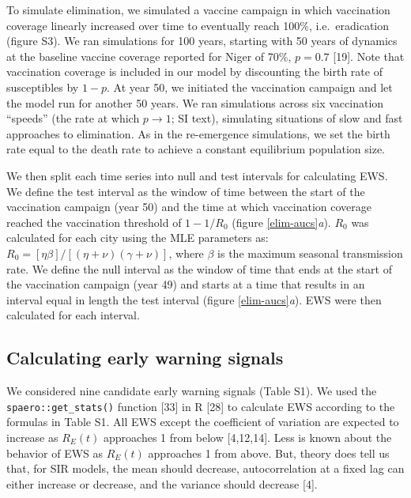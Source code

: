 \documentclass[3p]{elsarticle} %
\begin{document}
To simulate elimination, we simulated a vaccine campaign in which
vaccination coverage linearly increased over time to eventually reach
100\%, i.e.~eradication (figure S3). We ran simulations for 100 years,
starting with 50 years of dynamics at the baseline vaccine coverage
reported for Niger of 70\%, \(p = 0.7\) {[}19{]}. Note that vaccination
coverage is included in our model by discounting the birth rate of
susceptibles by \(1-p\). At year 50, we initiated the vaccination
campaign and let the model run for another 50 years. We ran simulations
across six vaccination ``speeds'' (the rate at which
\(p \rightarrow 1\); SI text), simulating situations of slow and fast
approaches to elimination. As in the re-emergence simulations, we set
the birth rate equal to the death rate to achieve a constant equilibrium
population size.

We then split each time series into null and test intervals for
calculating EWS. We define the test interval as the window of time
between the start of the vaccination campaign (year 50) and the time at
which vaccination coverage reached the vaccination threshold of
\(1 - 1/R_0\) (figure \ref{elim-aucs}\emph{a}). \(R_0\) was calculated
for each city using the MLE parameters as:
\(R_0 = \left[\eta \beta \right]/ \left[\left(\eta+\nu\right)\left(\gamma+\nu\right)\right]\),
where \(\beta\) is the maximum seasonal transmission rate. We define the
null interval as the window of time that ends at the start of the
vaccination campaign (year 49) and starts at a time that results in an
interval equal in length the test interval (figure
\ref{elim-aucs}\emph{a}). EWS were then calculated for each interval.

\hypertarget{calculating-early-warning-signals}{%
\subsection{Calculating early warning
signals}\label{calculating-early-warning-signals}}

We considered nine candidate early warning signals (Table S1). We used
the \texttt{spaero::get\_stats()} function {[}33{]} in R {[}28{]} to
calculate EWS according to the formulas in Table S1. All EWS except the
coefficient of variation are expected to increase as \(R_E(t)\)
approaches 1 from below {[}4,12,14{]}. Less is known about the behavior
of EWS as \(R_E(t)\) approaches 1 from above. But, theory does tell us
that, for SIR models, the mean should decrease, autocorrelation at a
fixed lag can either increase or decrease, and the variance should
decrease {[}4{]}.
\end{document}
